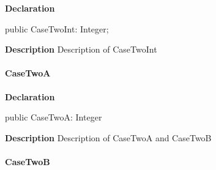 \documentclass{report}
\begin{document}
\begin{list}{}{
\setlength{\itemindent}{0cm}
\setlength{\listparindent}{0cm}
\setlength{\leftmargin}{\evensidemargin}
\addtolength{\leftmargin}{\tmplength}
\settowidth{\labelsep}{X}
\addtolength{\leftmargin}{\labelsep}
\setlength{\labelwidth}{\tmplength}
}
\begin{flushleft}
\item[\textbf{Declaration}\hfill]
\begin{ttfamily}
public CaseTwoInt: Integer;\end{ttfamily}


\end{flushleft}
\par
\item[\textbf{Description}]
Description of CaseTwoInt

\end{list}
\paragraph*{CaseTwoA}\hspace*{\fill}

\begin{list}{}{
\setlength{\itemindent}{0cm}
\setlength{\listparindent}{0cm}
\setlength{\leftmargin}{\evensidemargin}
\addtolength{\leftmargin}{\tmplength}
\settowidth{\labelsep}{X}
\addtolength{\leftmargin}{\labelsep}
\setlength{\labelwidth}{\tmplength}
}
\begin{flushleft}
\item[\textbf{Declaration}\hfill]
\begin{ttfamily}
public CaseTwoA: Integer\end{ttfamily}


\end{flushleft}
\par
\item[\textbf{Description}]
Description of CaseTwoA and CaseTwoB

\end{list}
\paragraph*{CaseTwoB}\hspace*{\fill}
\end{document}
